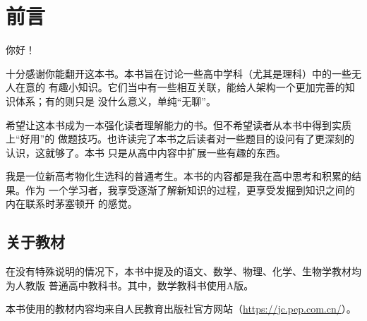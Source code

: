 \chapter{前言}

你好！

十分感谢你能翻开这本书。本书旨在讨论一些高中学科（尤其是理科）中的一些无人在意的
有趣小知识。它们当中有一些相互关联，能给人架构一个更加完善的知识体系；有的则只是
没什么意义，单纯“无聊”。

希望让这本书成为一本强化读者理解能力的书。但不希望读者从本书中得到实质上“好用”的
做题技巧。也许读完了本书之后读者对一些题目的设问有了更深刻的认识，这就够了。本书
只是从高中内容中扩展一些有趣的东西。

我是一位新高考物化生选科的普通考生。本书的内容都是我在高中思考和积累的结果。作为
一个学习者，我享受逐渐了解新知识的过程，更享受发掘到知识之间的内在联系时茅塞顿开
的感觉。

\section*{关于教材}

在没有特殊说明的情况下，本书中提及的语文、数学、物理、化学、生物学教材均为人教版
普通高中教科书。其中，数学教科书使用A版。

本书使用的教材内容均来自人民教育出版社官方网站（\url{https://jc.pep.com.cn/}）。
